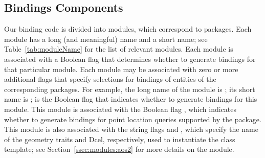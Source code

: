 \subsection{Bindings Components}
\label{sec:gen:components}
Our binding code is divided into modules, which correspond to \cgal{}
packages.  Each module has a long (and meaningful) name and a short
name; see Table~\ref{tab:moduleName} for the list of relevant
modules. Each module is associated with a \cmake{} Boolean flag that
determines whether to generate bindings for that particular
module. Each module may be associated with zero or more additional
flags that specify selections for bindings of entities of the
corresponding \cgal{} packages.  For example, the long name of the
\iiDArrangementsPackage{} module is
; its short name is
; 
 is the 
\cmake{} Boolean flag that indicates whether to generate bindings for
this module.  This module is associated with the Boolean flag 
,
which indicates whether to generate bindings for point location
queries supported by the \iiDArrangementsPackage{} package. This
module is also associated with the string flags
 and
, which specify the name of the
geometry traits and Dcel, respectively, used to instantiate the
 class template;
see Section~\ref{ssec:modules:aos2} for more details on the
\iiDArrangementsPackage{} module.

